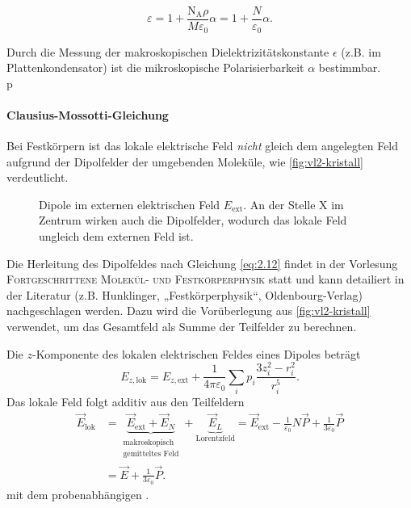     \begin{important}
        \begin{equation}
            \varepsilon = 1 + \frac{\text{N}_{\text{A}} \rho}{M \varepsilon_0} \alpha = 1 + \frac{N}{ \varepsilon_0} \alpha.
            \label{eq:2.11}
        \end{equation}
    \end{important}
    
    Durch die Messung der makroskopischen Dielektrizitätskonstante $\epsilon$ (z.B. im Plattenkondensator) ist die mikroskopische Polarisierbarkeit $\alpha$ bestimmbar.\\
p
\paragraph{Clausius-Mossotti-Gleichung}
    Bei Festkörpern ist das lokale elektrische Feld \emph{nicht} gleich dem angelegten Feld aufgrund der Dipolfelder der umgebenden Moleküle, wie \autoref{fig:vl2-kristall} verdeutlicht.\\
    \begin{figure}[H]
        \centering
        \caption{Dipole im externen elektrischen Feld $E_\text{ext}$. An der Stelle X im Zentrum wirken auch die Dipolfelder, wodurch das lokale Feld ungleich dem externen Feld ist.}
        \label{fig:vl2-kristall}
    \end{figure} 
    \begin{verbal}
        Die Herleitung des Dipolfeldes nach Gleichung \eqref{eq:2.12} findet in der Vorlesung \textsc{Fortgeschrittene Molekül- und Festkörperphysik} statt und kann detailiert in der Literatur (z.B. Hunklinger, „Festkörperphysik“, Oldenbourg-Verlag) nachgeschlagen werden. Dazu wird die Vorüberlegung aus \autoref{fig:vl2-kristall} verwendet, um das Gesamtfeld als Summe der Teilfelder zu berechnen.
    \end{verbal}
    Die $z$-Komponente des lokalen elektrischen Feldes eines Dipoles beträgt
    $$
    E_{z, \text{lok}} = E_{z, \text{ext}} + \frac{1}{4 \pi \varepsilon_{0}} \sum_{i}^{} p_{i} \frac{3 z_{i}^2 - r_{i}^2}{r_{i}^{5}}.
    $$
    Das lokale Feld folgt additiv aus den Teilfeldern
    \begin{align}\nonumber
    	\vec{E}_{\text{lok}} 
        &= \underbrace{\vec{E}_\text{ext}+ {\vec{E}_{N}}}_{\substack{\text{makroskopisch}\\\text{gemitteltes Feld}}} 
            + \underbrace{\vec{E}_{L}}_\text{Lorentzfeld} 
            = \vec{E}_{\text{ext}} 
            - {\frac{1}{\varepsilon_0}N\vec{P}}
            + \frac{1}{3 \varepsilon_0} \vec{P} \\
    	&= \vec{E} + \frac{1}{3 \varepsilon_0} \vec{P}.\label{eq:2.12}
    \end{align}
    mit dem probenabhängigen .
    

